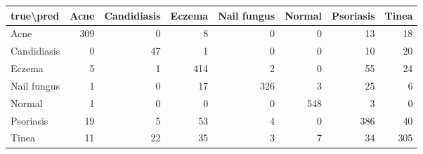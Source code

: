 \begin{tabular}{lrrrrrrr}
\toprule
true\textbackslash pred & Acne & Candidiasis & Eczema & Nail fungus & Normal & Psoriasis & Tinea \\
\midrule
Acne & 309 & 0 & 8 & 0 & 0 & 13 & 18 \\
Candidiasis & 0 & 47 & 1 & 0 & 0 & 10 & 20 \\
Eczema & 5 & 1 & 414 & 2 & 0 & 55 & 24 \\
Nail fungus & 1 & 0 & 17 & 326 & 3 & 25 & 6 \\
Normal & 1 & 0 & 0 & 0 & 548 & 3 & 0 \\
Psoriasis & 19 & 5 & 53 & 4 & 0 & 386 & 40 \\
Tinea & 11 & 22 & 35 & 3 & 7 & 34 & 305 \\
\bottomrule
\end{tabular}
